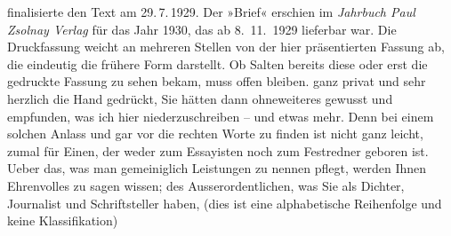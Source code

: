 \begin{ledgroupsized}[t]{13cm}
{{{                  finalisierte den Text am 29. 7. 1929. Der »Brief« erschien im \emph{Jahrbuch Paul Zsolnay Verlag} für das Jahr 1930, das ab
                     8. 11. 1929 lieferbar war. Die Druckfassung weicht an mehreren
                  Stellen von der hier präsentierten Fassung ab, die eindeutig die frühere Form
                  darstellt. Ob Salten bereits diese oder erst
                  die gedruckte Fassung zu sehen bekam, muss offen bleiben.}}}\label{K_L02950-1h} ganz privat und
               sehr herzlich die Hand gedrückt, Sie hätten dann ohneweiteres gewusst und empfunden,
               was ich hier niederzuschreiben \label{K_L02950-11v}\label{K_L02950-11h} – und etwas mehr.
               Denn bei einem solchen Anlass und gar vor \label{K_L02950-111v}\label{K_L02950-111h} die rechten Worte zu finden ist nicht ganz leicht, zumal
               für Einen, der weder zum Essayisten noch zum Festredner geboren ist. \pend
           \pstart
           Ueber das, was man gemeiniglich Leistungen zu nennen pflegt, werden Ihnen \label{K_L02950-1111v}\label{K_L02950-1111h} Ehrenvolles zu sagen
               wissen; \label{K_L02950-2v}\label{K_L02950-2h} des Ausserordentlichen, was Sie als
               Dichter, Journalist und Schriftsteller \label{K_L02950-3v}\label{K_L02950-3h} haben, (dies ist eine alphabetische Reihenfolge
               und keine Klassifikation) \label{K_L02950-v}
\end{ledgroupsized}

